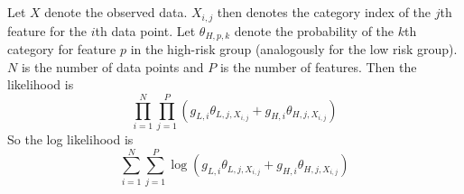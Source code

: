 \documentclass[10pt]{article}
\begin{document}
\section{}
\subsection{}
Let $X$ denote the observed data. $X_{i,j}$ then denotes the category index of the $j$th feature for the $i$th data point. Let $\theta_{H,p,k}$ denote the probability of the $k$th category for feature $p$ in the high-risk group (analogously for the low risk group). $N$ is the number of data points and $P$ is the number of features. Then the likelihood is 
\[\prod_{i=1}^N\prod_{j=1}^P (g_{L,i}\theta_{L,j,{X_{i,j}}} + g_{H,i}\theta_{H,j,{X_{i,j}}}) \] 
So the log likelihood is 
\[\sum_{i=1}^N\sum_{j=1}^P \log(g_{L,i}\theta_{L,j,{X_{i,j}}} + g_{H,i}\theta_{H,j,{X_{i,j}}}) \] 
\end{document}
